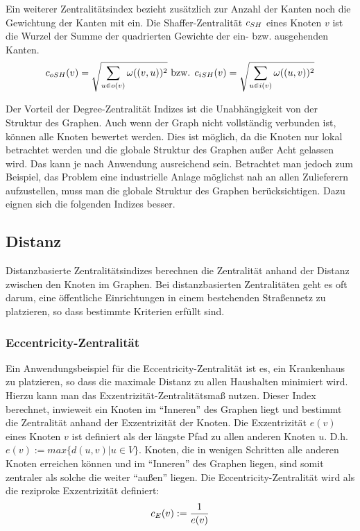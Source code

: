 Ein weiterer Zentralitätsindex bezieht zusätzlich zur Anzahl der Kanten noch die Gewichtung der Kanten mit ein. Die Shaffer-Zentralität $c_{SH}$ eines Knoten $v$ ist die Wurzel der Summe der quadrierten Gewichte der ein- bzw. ausgehenden Kanten. 
\[
c_{oSH}(v) = \sqrt{\sum_{u \in o(v)} \omega((v,u))^2 } \mbox{ bzw. } c_{iSH}(v) = \sqrt{\sum_{u \in i(v)} \omega((u,v))^2 }
\]

Der Vorteil der Degree-Zentralität Indizes ist die Unabhängigkeit von der Struktur des Graphen. Auch wenn der Graph nicht vollständig verbunden ist, können alle Knoten bewertet werden. Dies ist möglich, da die Knoten nur lokal betrachtet werden und die globale Struktur des Graphen außer Acht gelassen wird. Das kann je nach Anwendung ausreichend sein. Betrachtet man jedoch zum Beispiel, das Problem eine industrielle Anlage möglichst nah an allen Zulieferern aufzustellen, muss man die globale Struktur des Graphen berücksichtigen. Dazu eignen sich die folgenden Indizes besser. 

\subsection{Distanz}

Distanzbasierte Zentralitätsindizes berechnen die Zentralität anhand der Distanz zwischen den Knoten im Graphen. Bei distanzbasierten Zentralitäten geht es oft darum, eine öffentliche Einrichtungen in einem bestehenden Straßennetz zu platzieren, so dass bestimmte Kriterien erfüllt sind. 

\subsubsection{Eccentricity-Zentralität}
Ein Anwendungsbeispiel für die Eccentricity-Zentralität ist es, ein Krankenhaus zu platzieren, so dass die maximale Distanz zu allen Haushalten minimiert wird. Hierzu kann man das Exzentrizität-Zentralitätsmaß nutzen. Dieser Index berechnet, inwieweit ein Knoten im ``Inneren'' des Graphen liegt und bestimmt die Zentralität anhand der Exzentrizität der Knoten. Die Exzentrizität $e(v)$ eines Knoten $v$ ist definiert als der längste Pfad zu allen anderen Knoten $u$. D.h. $e(v) := max\lbrace d(u,v) | u \in V\rbrace$. Knoten, die in wenigen Schritten alle anderen Knoten erreichen können und im ``Inneren'' des Graphen liegen, sind somit zentraler als solche die weiter ``außen'' liegen. Die Eccentricity-Zentralität wird als die reziproke Exzentrizität definiert: 
\[c_{E}(v) := \frac{1}{e(v)}\]

